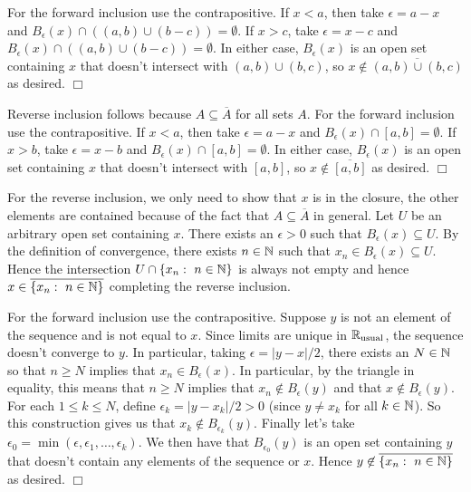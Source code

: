 \documentclass{article}
\begin{document}
{\begin{spacedenumerate}
        For the forward inclusion use the contrapositive. If $x < a$, then take $\epsilon = a - x$ and $B_{\epsilon}(x)\cap ((a,b)\cup (b-c)) = \emptyset$. If $x > c$, take $\epsilon = x-c$ and $B_{\epsilon}(x)\cap((a,b)\cup (b-c)) = \emptyset$. In either case, $B_{\epsilon}(x)$ is an open set containing $x$ that doesn't intersect with $(a,b)\cup(b,c)$, so $x\not\in \overline{(a,b)\cup(b,c)}$ as desired. $\Box$
        \item Reverse inclusion follows because $A\subseteq \overline{A}$ for all sets $A$. For the forward inclusion use the contrapositive. If $x < a$, then take $\epsilon = a - x$ and $B_{\epsilon}(x)\cap [a,b] = \emptyset$. If $x > b$, take $\epsilon = x-b$ and $B_{\epsilon}(x)\cap[a,b] = \emptyset$. In either case, $B_{\epsilon}(x)$ is an open set containing $x$ that doesn't intersect with $[a,b]$, so $x\not\in \overline{[a,b]}$ as desired. $\Box$
        \item For the reverse inclusion, we only need to show that $x$ is in the closure, the other elements are contained because of the fact that $A\subseteq \overline{A}$ in general. Let $U$ be an arbitrary open set containing $x$. There exists an $\epsilon > 0$ such that $B_{\epsilon}(x)\subseteq U$. By the definition of convergence, there exists $n\in \mathbb{N}$ such that $x_{n}\in B_{\epsilon}(x)\subseteq U$. Hence the intersection $U\cap \{x_{n}:\ n\in \mathbb{N}\}$ is always not empty and hence $x\in \overline{\{x_{n}:\ n\in \mathbb{N}\}}$ completing the reverse inclusion.
        
        For the forward inclusion use the contrapositive. Suppose $y$ is not an element of the sequence and is not equal to $x$. Since limits are unique in $\mathbb{R}_{\text{usual}}$, the sequence doesn't converge to $y$. In particular, taking $\epsilon = \lvert y-x\rvert/2$, there exists an $N\in \mathbb{N}$ so that $n\geq N$ implies that $x_{n}\in B_{\epsilon}(x)$. In particular, by the triangle in equality, this means that $n\geq N$ implies that $x_{n}\not\in B_{\epsilon}(y)$ and that $x\not\in B_{\epsilon}(y)$. For each $1\leq k \leq N$, define $\epsilon_{k} = \lvert y - x_{k}\rvert/2 > 0$ (since $y\neq x_{k}$ for all $k\in\mathbb{N}$). So this construction gives us that $x_{k}\not\in B_{\epsilon_{k}}(y)$. Finally let's take $\epsilon_{0} = \min(\epsilon, \epsilon_{1},\dots, \epsilon_{k})$. We then have that $B_{\epsilon_{0}}(y)$ is an open set containing $y$ that doesn't contain any elements of the sequence or $x$. Hence $y\not\in \overline{\{x_{n}:\ n\in \mathbb{N}\}}$ as desired. $\Box$
    \end{spacedenumerate}
}
\end{document}
